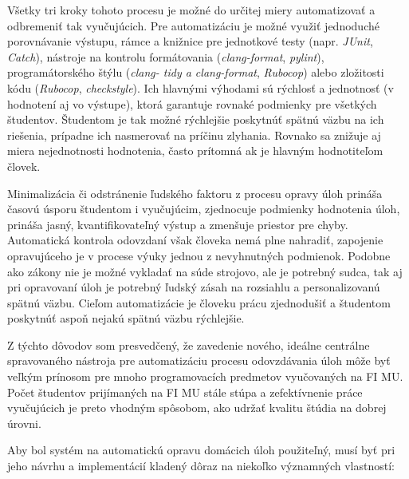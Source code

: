 \documentclass[
  digital, %
  twoside, %
  table,   %
  lof,     %
  lot,     %
]{fithesis3}
\begin{document}
Všetky tri kroky tohoto procesu je možné do určitej miery automatizovať a odbremeniť tak vyučujúcich. Pre automatizáciu je možné využiť jednoduché porovnávanie výstupu, rámce a knižnice pre jednotkové testy (napr. \textit{JUnit}, \textit{Catch}), nástroje na kontrolu formátovania (\textit{clang-format}, \textit{pylint}), programátorského štýlu (\textit{clang- tidy a clang-format}, \textit{Rubocop}) alebo zložitosti kódu (\textit{Rubocop}, \textit{checkstyle}). Ich hlavnými výhodami sú rýchlosť a jednotnosť (v hodnotení aj vo výstupe), ktorá garantuje rovnaké podmienky pre všetkých študentov. Študentom je tak možné rýchlejšie poskytnúť spätnú väzbu na ich riešenia, prípadne ich nasmerovať na príčinu zlyhania. Rovnako sa znižuje aj miera nejednotnosti hodnotenia, často prítomná ak je hlavným hodnotiteľom človek.

Minimalizácia či odstránenie ľudského faktoru z procesu opravy úloh prináša časovú úsporu študentom i vyučujúcim, zjednocuje podmienky hodnotenia úloh, prináša jasný, kvantifikovateľný výstup a zmenšuje priestor pre chyby. Automatická kontrola odovzdaní však človeka nemá plne nahradiť, zapojenie opravujúceho je v procese výuky jednou z nevyhnutných podmienok. Podobne ako zákony nie je možné vykladať na súde strojovo, ale je potrebný sudca, tak aj pri opravovaní úloh je potrebný ľudský zásah na rozsiahlu a personalizovanú spätnú väzbu. Cieľom automatizácie je človeku prácu zjednodušiť a študentom poskytnúť aspoň nejakú spätnú väzbu rýchlejšie.

Z týchto dôvodov som presvedčený, že zavedenie nového, ideálne centrálne spravovaného nástroja pre automatizáciu procesu odovzdávania úloh môže byť veľkým prínosom pre mnoho programovacích predmetov vyučovaných na FI MU. Počet študentov prijímaných na FI MU stále stúpa a zefektívnenie práce vyučujúcich je preto vhodným spôsobom, ako udržať kvalitu štúdia na dobrej úrovni.

Aby bol systém na automatickú opravu domácich úloh použiteľný, musí byť pri jeho návrhu a implementácií kladený dôraz na niekoľko významných vlastností:
\end{document}
